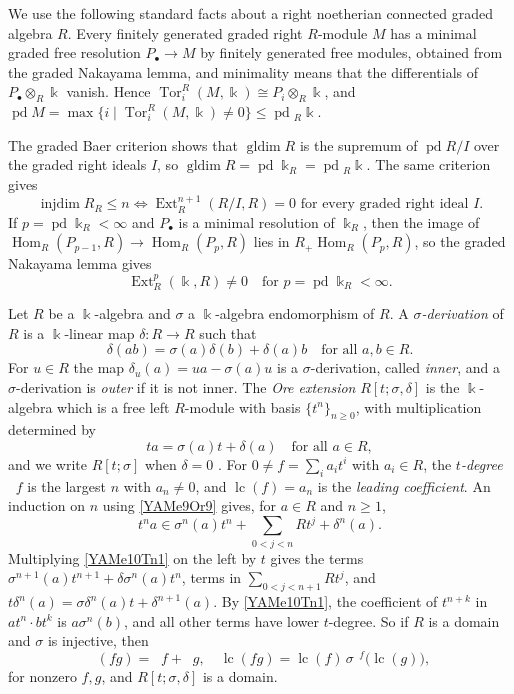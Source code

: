 \documentclass[reqno]{amsart}
\numberwithin{equation}{section}
\theoremstyle{definition}
\theoremstyle{remark}
\theoremstyle{plain}
\newcommand{\kk}{\Bbbk}
\DeclareMathOperator{\degt}{deg_t}
\DeclareMathOperator{\lc}{lc}
\DeclareMathOperator{\Ext}{Ext}
\DeclareMathOperator{\Tor}{Tor}
\DeclareMathOperator{\Hom}{Hom}
\DeclareMathOperator{\pd}{pd}
\DeclareMathOperator{\injdim}{injdim}
\DeclareMathOperator{\gldim}{gldim}
\begin{document}
We use the following standard facts about a right noetherian connected graded algebra $R$. Every finitely generated graded right $R$-module $M$ has a minimal graded free resolution $P_\bullet\to M$ by finitely generated free modules, obtained from the graded Nakayama lemma, and minimality means that the differentials of $P_\bullet\otimes_R\kk$ vanish. Hence $\Tor^R_i(M,\kk)\cong P_i\otimes_R\kk$, and $\pd M=\max\{i\mid\Tor^R_i(M,\kk)\neq0\}\le\pd{}_R\kk$.

The graded Baer criterion shows that $\gldim R$ is the supremum of $\pd R/I$ over the graded right ideals $I$, so $\gldim R=\pd\kk_R=\pd{}_R\kk$. The same criterion gives
\begin{equation}\label{YAMe1Ba1}
\injdim R_R\le n\iff\Ext^{n+1}_R(R/I,R)=0\text{ for every graded right ideal }I.
\end{equation}
If $p=\pd\kk_R<\infty$ and $P_\bullet$ is a minimal resolution of $\kk_R$, then the image of $\Hom_R(P_{p-1},R)\to\Hom_R(P_p,R)$ lies in $R_+\Hom_R(P_p,R)$, so the graded Nakayama lemma gives
\begin{equation}\label{YAMe1Ba2}
\Ext^p_R(\kk,R)\neq0\quad\text{for }p=\pd\kk_R<\infty.
\end{equation}

Let $R$ be a $\kk$-algebra and $\sigma$ a $\kk$-algebra endomorphism of $R$. A \emph{$\sigma$-derivation} of $R$ is a $\kk$-linear map $\delta\colon R\to R$ such that
\begin{equation}\label{YAMe7Sd7}
\delta(ab)=\sigma(a)\delta(b)+\delta(a)b\quad\text{for all }a,b\in R.
\end{equation}
For $u\in R$ the map $\delta_u(a)=ua-\sigma(a)u$ is a $\sigma$-derivation, called \emph{inner}, and a $\sigma$-derivation is \emph{outer} if it is not inner. The \emph{Ore extension} $R[t;\sigma,\delta]$ is the $\kk$-algebra which is a free left $R$-module with basis $\{t^n\}_{n\ge0}$, with multiplication determined by
\begin{equation}\label{YAMe9Or9}
ta=\sigma(a)t+\delta(a)\quad\text{for all }a\in R,
\end{equation}
and we write $R[t;\sigma]$ when $\delta=0$ \cite[\S1.2]{MR}. For $0\neq f=\sum_ia_it^i$ with $a_i\in R$, the \emph{$t$-degree} $\degt f$ is the largest $n$ with $a_n\neq0$, and $\lc(f)=a_n$ is the \emph{leading coefficient}. An induction on $n$ using \eqref{YAMe9Or9} gives, for $a\in R$ and $n\ge1$,
\begin{equation}\label{YAMe10Tn1}
t^na\in\sigma^n(a)t^n+\sum_{0<j<n}Rt^j+\delta^n(a).
\end{equation}
Multiplying \eqref{YAMe10Tn1} on the left by $t$ gives the terms $\sigma^{n+1}(a)t^{n+1}+\delta\sigma^n(a)t^n$, terms in $\sum_{0<j<n+1}Rt^j$, and $t\delta^n(a)=\sigma\delta^n(a)t+\delta^{n+1}(a)$. By \eqref{YAMe10Tn1}, the coefficient of $t^{n+k}$ in $at^n\cdot bt^k$ is $a\sigma^n(b)$, and all other terms have lower $t$-degree. So if $R$ is a domain and $\sigma$ is injective, then
\begin{equation}\label{YAMe29Dt3}
\degt(fg)=\degt f+\degt g,\quad\lc(fg)=\lc(f)\,\sigma^{\degt f}\big(\lc(g)\big),
\end{equation}
for nonzero $f,g$, and $R[t;\sigma,\delta]$ is a domain.
\end{document}
